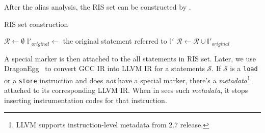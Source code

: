 After the alias analysis, the RIS set can be constructed by .
\begin{algorithm}
	\caption{RIS set construction}
	\label{a:RIS-set-construction}
	\begin{algorithmic}[1]
		\State $\mathcal{R} \gets \emptyset$
				\State {}
				\State $\mathbb{I}'_{original} \gets$ the original statement referred to $\mathbb{I}'$
				\State $\mathcal{R} \gets \mathcal{R} \cup \mathbb{I}'_{original}$
			\EndFor
		\EndFor
	\end{algorithmic}
\end{algorithm}
A special marker is then attached to the all statements in RIS set. Later, we use DragonEgg~\cite{DragonEgg} to convert GCC IR into LLVM IR for a statements $\mathcal{S}$. If $\mathcal{S}$ is a \verb|load| or a \verb|store| instruction and does \textit{not} have a special marker, there's a \textit{metadata}\footnote{LLVM supports instruction-level metadata from 2.7 release.} attached to its corresponding LLVM IR. When \Rewriter{} in \ThreadTracer{} sees such \textit{metadata}, it stops inserting instrumentation codes for that instruction.